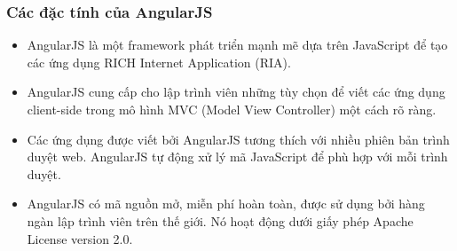 \documentclass[a4paper]{article}
\begin{document}
\subsubsection{Các đặc tính của AngularJS}
\begin{itemize}
	\item AngularJS là một framework phát triển mạnh mẽ dựa trên JavaScript để tạo các ứng dụng RICH Internet Application (RIA).

	\item AngularJS cung cấp cho lập trình viên những tùy chọn để viết các ứng dụng client-side trong mô hình MVC (Model View Controller) một cách rõ ràng.

	\item Các ứng dụng được viết bởi AngularJS tương thích với nhiều phiên bản trình duyệt web. AngularJS tự động xử lý mã JavaScript để phù hợp với mỗi trình duyệt.

	\item AngularJS có mã nguồn mở, miễn phí hoàn toàn, được sử dụng bởi hàng ngàn lập trình viên trên thế giới. Nó hoạt động dưới giấy phép Apache License version 2.0.
\end{itemize}
\end{document}
